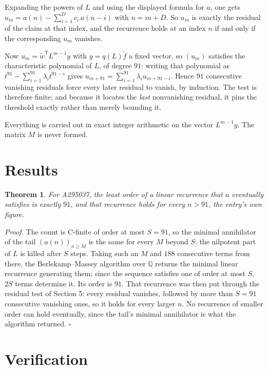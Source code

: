 \documentclass[11pt]{article}
\newtheorem{theorem}{Theorem}
\theoremstyle{definition}
\begin{document}
Expanding the powers of $L$ and using the displayed formula for $a$, one gets $u_m = a(n) - \sum_{i=1}^{D} c_i\,a(n-i)$ with $n = m + D$. So $u_m$ is exactly the residual of the claim at that index, and the recurrence holds at an index $n$ if and only if the corresponding $u_m$ vanishes.

Now $u_m = \tilde w^{\mathsf T} L^{m-1} y$ with $y = q(L)\tilde f$ a fixed vector, so $(u_m)$ satisfies the characteristic polynomial of $L$, of degree $91$: writing that polynomial as $t^{91} - \sum_{i=1}^{91} \lambda_i t^{91-i}$ gives $u_{m+91} = \sum_{i=1}^{91} \lambda_i u_{m+91-i}$. Hence $91$ consecutive vanishing residuals force every later residual to vanish, by induction. The test is therefore finite; and because it locates the {\itshape last} nonvanishing residual, it pins the threshold exactly rather than merely bounding it.

Everything is carried out in exact integer arithmetic on the vector $L^{m-1}y$. The matrix $M$ is never formed.

\section{Results}

\begin{theorem} For A295037, the least order of a linear recurrence that $a$ eventually satisfies is exactly $91$, and that recurrence holds for every $n > 91$, the entry's own figure.\end{theorem}

{\itshape Proof.} The count is C-finite of order at most $S = 91$, so the minimal annihilator of the tail $(a(n))_{n \ge M}$ is the same for every $M$ beyond $S$: the nilpotent part of $L$ is killed after $S$ steps. Taking such an $M$ and $188$ consecutive terms from there, the Berlekamp--Massey algorithm over $\mathbb{Q}$ returns the minimal linear recurrence generating them; since the sequence satisfies one of order at most $S$, $2S$ terms determine it. Its order is $91$. That recurrence was then put through the residual test of Section 5: every residual vanishes, followed by more than $S = 91$ consecutive vanishing ones, so it holds for every larger $n$. No recurrence of smaller order can hold eventually, since the tail's minimal annihilator is what the algorithm returned. $\square$

\section{Verification}
\end{document}
